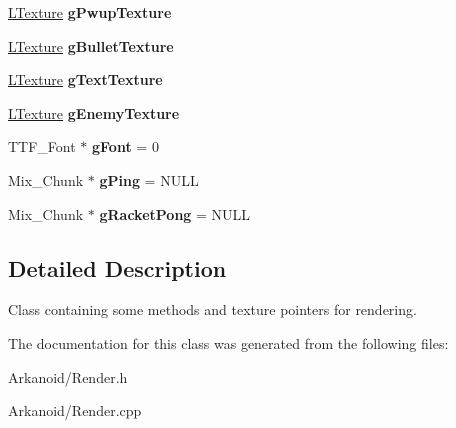 \begin{DoxyCompactItemize}
\item 
\mbox{\label{class_render_a02ca1847aad2235c4c703f4f4ee20b78}} 
\hyperlink{class_l_texture}{L\+Texture} {\bfseries g\+Pwup\+Texture}
\item 
\mbox{\label{class_render_a8c281707bee4ff9460abf48e2fbf0f9c}} 
\hyperlink{class_l_texture}{L\+Texture} {\bfseries g\+Bullet\+Texture}
\item 
\mbox{\label{class_render_a34a83802700f31426f018fb201d412dc}} 
\hyperlink{class_l_texture}{L\+Texture} {\bfseries g\+Text\+Texture}
\item 
\mbox{\label{class_render_af3847d2c17f0062661e6b8c0b06170db}} 
\hyperlink{class_l_texture}{L\+Texture} {\bfseries g\+Enemy\+Texture}
\item 
\mbox{\label{class_render_af372a476ddfb76f9e641ca629766daff}} 
T\+T\+F\+\_\+\+Font $\ast$ {\bfseries g\+Font} = 0
\item 
\mbox{\label{class_render_af2b513498a39277236db315092995f5b}} 
Mix\+\_\+\+Chunk $\ast$ {\bfseries g\+Ping} = N\+U\+LL
\item 
\mbox{\label{class_render_a018ac074d1596fdc0f5cc6f474605ec9}} 
Mix\+\_\+\+Chunk $\ast$ {\bfseries g\+Racket\+Pong} = N\+U\+LL
\end{DoxyCompactItemize}


\subsection{Detailed Description}
Class containing some methods and texture pointers for rendering. 

The documentation for this class was generated from the following files\+:\begin{DoxyCompactItemize}
\item 
Arkanoid/Render.\+h\item 
Arkanoid/Render.\+cpp\end{DoxyCompactItemize}
